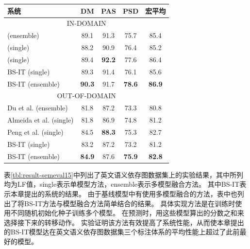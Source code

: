 \begin{table}[htpb]
    \vspace{0.5em}\centering\wuhao
	\begin{tabular}{lcccc}
		\toprule[1.5pt]
		系统& DM & PAS & PSD & 宏平均\\
		\midrule[1pt]
		\multicolumn{5}{c}{IN-DOMAIN}\\
		\hline
		\citet{du-etal-2015-peking} (ensemble) &89.1&91.3&75.7&85.4\\
		\citet{almeida-martins-2015-lisbon} (single) &88.2&90.9&76.4&85.2\\
		\citet{peng-etal-2017-deep} (single) &89.4&\bf 92.2&77.6&86.4\\
		BS-IT (single) &89.3&91.4&76.1&85.6\\
		BS-IT (ensemble) &\bf 90.3& 91.7&\bf 78.6&\bf 86.9\\
		\hline
		\multicolumn{5}{c}{OUT-OF-DOMAIN}\\
		\hline
		Du et al. (ensemble) &81.8&87.2&73.3&80.8\\
		Almeida et al. (single) &81.8&86.9&74.8&81.2\\
		Peng et al. (single) &84.5&\bf 88.3&75.3&82.7\\
		BS-IT (single) &83.2&87.2&73.2&81.2\\
		BS-IT (ensemble) &\bf 84.9&87.6&\bf 75.9&\bf 82.8\\
		\bottomrule[1.5pt]
	\end{tabular}
\end{table}

表\ref{tbl:result-semeval15}中列出了英文语义依存图数据集上的实验结果，其中所列均为LF值，single表示单模型方法，ensemble表示多模型融合方法。
其中BS-IT表示本章提出的系统的结果。
由于基线模型中有使用多模型融合的方法，表中也列出了将BS-IT方法与模型融合方法简单结合的结果。
具体实现方法是在训练时使用不同随机初始化种子训练多个模型。
在预测时，用这些模型算出的分数之和来选择接下来的转移动作。
实验证明该方法有效提高了系统性能，从而使本章提出的BS-IT模型达在英文语义依存图数据集三个标注体系的平均性能上超过了此前最好的模型。


